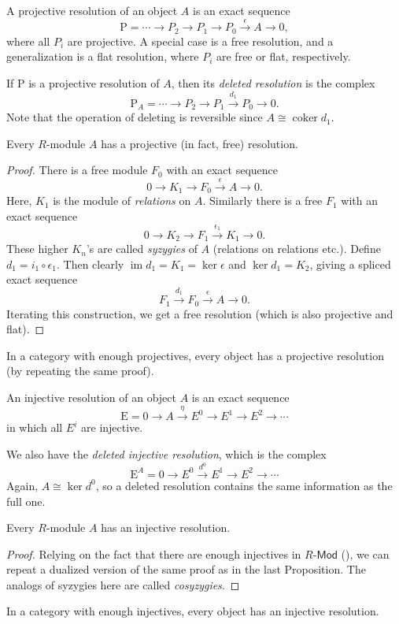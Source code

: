 \documentclass[english,letterpaper]{article}%
\numberwithin{equation}{section}
\numberwithin{figure}{section}
\numberwithin{table}{section}
\theoremstyle{definition}
\theoremstyle{definition}
\theoremstyle{definition}
\theoremstyle{plain}
\theoremstyle{plain}
\theoremstyle{plain}
\theoremstyle{plain}
\theoremstyle{remark}
\theoremstyle{remark}
\newcommand{\bm}[1]{\boldsymbol{\mathrm{#1}}}
\DeclareMathOperator{\im}{im}
\DeclareMathOperator{\coker}{coker}
\begin{document}
\begin{defn}
    A projective resolution of an object $A$ is an exact sequence
    \[\bm{P}=\cdots \to P_2\to P_1\to P_0\overset\epsilon\to A\to 0,\]
    where all $P_i$ are projective. A special case is a free resolution, and a generalization is a flat resolution, where $P_i$ are free or flat, respectively.
    
    If $\bm{P}$ is a projective resolution of $A$, then its \emph{deleted resolution} is the complex
    \[\bm{P}_A=\cdots\to P_2\to P_1\overset{d_1}\to P_0\to 0.\]
    Note that the operation of deleting is reversible since $A\cong \coker d_1$.
\end{defn}


\begin{prop}
    Every $R$-module $A$ has a projective (in fact, free) resolution. 
\end{prop}
\begin{proof}
     There is a free module $F_0$ with an exact sequence
     \[0\to K_1\to F_0\overset\epsilon\to A\to 0.\]
     Here, $K_1$ is the module of \emph{relations} on $A$. Similarly there is a free $F_1$ with an exact sequence
     \[0\to K_2\to F_1\overset{\epsilon_1}\to K_1\to 0.\]
     These higher $K_n$'s are called \emph{syzygies} of $A$ (relations on relations etc.).
     Define $d_1=i_1\circ\epsilon_1$. Then clearly $\im d_1=K_1=\ker\epsilon$ and $\ker d_1=K_2$, giving a spliced exact sequence
     \[F_1\overset{d_1}\to F_0\overset\epsilon\to A\to 0.\]
     Iterating this construction, we get a free resolution (which is also projective and flat).
\end{proof}
\begin{cor}
    In a category with enough projectives, every object has a projective resolution (by repeating the same proof).
\end{cor}

\begin{defn}
    An injective resolution of an object $A$ is an exact sequence
    \[\bm{E}=0\to A\overset\eta\to E^0\to E^1\to E^2\to \cdots\]
    in which all $E^i$ are injective.
    
    We also have the \emph{deleted injective resolution}, which is the complex
    \[\bm{E}^A=0\to E^0\overset{d^0}\to E^1\to E^2\to \cdots\]
    Again, $A\cong\ker d^0$, so a deleted resolution contains the same information as the full one.
\end{defn}

\begin{prop}
    Every $R$-module $A$ has an injective resolution.
\end{prop}
\begin{proof}
     Relying on the fact that there are enough injectives in $R\text{-}\mathsf{Mod}$ (\cite[Thm. 3.38]{Rotman}), we can repeat a dualized version of the same proof as in the last Proposition. The analogs of syzygies here are called \emph{cosyzygies}.
\end{proof}
\begin{cor}
    In a category with enough injectives, every object has an injective resolution.
\end{cor}
\end{document}
